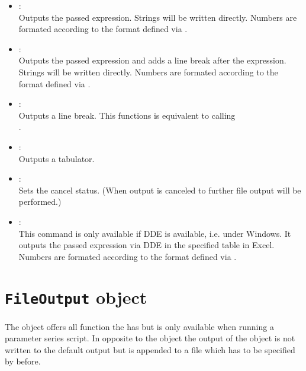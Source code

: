 \begin{itemize}
\item
{}:\\
Outputs the passed expression.
Strings will be written directly. Numbers are formated according to the format
defined via .

\item
{}:\\
Outputs the passed expression and adds a line break after the expression.
Strings will be written directly. Numbers are formated according to the format
defined via .

\item
{}:\\
Outputs a line break. This functions is equivalent to calling\\
.

\item
{}:\\
Outputs a tabulator.

\item
{}:\\
Sets the cancel status. (When output is canceled to further file output will be performed.)

\item
{}:\\
This command is only available if DDE is available, i.e. under Windows.
It outputs the passed expression via DDE in the specified table in Excel.
Numbers are formated according to the format defined via .

\end{itemize}



\chapter{\texttt{FileOutput} object}

The  object offers all function the  has
but is only available when running a parameter series script. In opposite
to the  object the output of the  object
is not written to the default output but is appended to a file which has
to be specified by  before.



